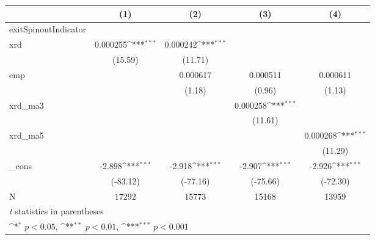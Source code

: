 {
\def\sym#1{\ifmmode^{#1}\else\(^{#1}\)\fi}
\begin{tabular}{l*{4}{c}}
\hline\hline
            &\multicolumn{1}{c}{(1)}         &\multicolumn{1}{c}{(2)}         &\multicolumn{1}{c}{(3)}         &\multicolumn{1}{c}{(4)}         \\
\hline
exitSpinoutIndicator&                     &                     &                     &                     \\
xrd         &    0.000255\sym{***}&    0.000242\sym{***}&                     &                     \\
            &     (15.59)         &     (11.71)         &                     &                     \\
[1em]
emp         &                     &    0.000617         &    0.000511         &    0.000611         \\
            &                     &      (1.18)         &      (0.96)         &      (1.13)         \\
[1em]
xrd\_ma3     &                     &                     &    0.000258\sym{***}&                     \\
            &                     &                     &     (11.61)         &                     \\
[1em]
xrd\_ma5     &                     &                     &                     &    0.000268\sym{***}\\
            &                     &                     &                     &     (11.29)         \\
[1em]
\_cons      &      -2.898\sym{***}&      -2.918\sym{***}&      -2.907\sym{***}&      -2.926\sym{***}\\
            &    (-83.12)         &    (-77.16)         &    (-75.66)         &    (-72.30)         \\
\hline
N           &       17292         &       15773         &       15168         &       13959         \\
\hline\hline
\multicolumn{5}{l}{\footnotesize \textit{t} statistics in parentheses}\\
\multicolumn{5}{l}{\footnotesize \sym{*} \(p<0.05\), \sym{**} \(p<0.01\), \sym{***} \(p<0.001\)}\\
\end{tabular}
}
